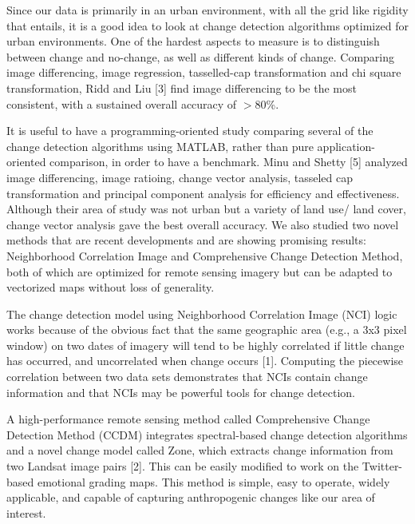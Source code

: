 \documentclass[conference]{IEEEtran}
\begin{document}
Since our data is primarily in an urban environment, with all the grid like rigidity that entails, it is a good idea to look at change detection algorithms optimized for urban environments. One of the hardest aspects to measure is to distinguish between change and no-change, as well as different kinds of change. Comparing image differencing, image regression, tasselled-cap transformation and chi square transformation, Ridd and Liu [3] find image differencing to be the most consistent, with a sustained overall accuracy of 
$>$80\%.

It is useful to have a programming-oriented study comparing several of the change detection algorithms using MATLAB, rather than pure application-oriented comparison, in order to have a benchmark. Minu and Shetty [5] analyzed image differencing, image ratioing, change vector analysis, tasseled cap transformation and principal component analysis for efficiency and effectiveness. Although their area of study was not urban but a variety of land use/ land cover, change vector analysis gave the best overall accuracy.
We also studied two novel methods that are recent developments and are showing promising results: Neighborhood Correlation Image and Comprehensive Change Detection Method, both of which are optimized for remote sensing imagery but can be adapted to vectorized maps without loss of generality.

The change detection model using Neighborhood Correlation Image (NCI) logic works because of the obvious fact that the same geographic area (e.g., a 3x3 pixel window) on two dates of imagery will tend to be highly correlated if little change has occurred, and uncorrelated when change occurs [1]. Computing the piecewise correlation between two data sets demonstrates that NCIs contain change information and that NCIs may be powerful tools for change detection.

A high-performance remote sensing method called Comprehensive Change Detection Method (CCDM) integrates spectral-based change detection algorithms and a novel change model called Zone, which extracts change information from two Landsat image pairs [2]. This can be easily modified to work on the Twitter-based emotional grading maps. This method is simple, easy to operate, widely applicable, and capable of capturing anthropogenic changes like our area of interest.
\end{document}
